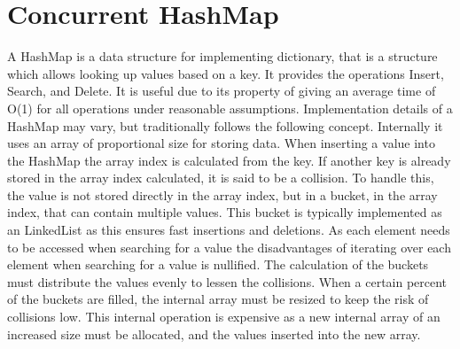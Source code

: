 \section{Concurrent HashMap}\label{app:hashmap}
A HashMap is a data structure for implementing dictionary, that is a structure which allows looking up values based on a key. It provides the operations Insert, Search, and Delete. It is useful due to its property of giving an average time of O(1) for all operations under reasonable assumptions\cite[p. 253]{cormen2009introduction}. Implementation details of a HashMap may vary, but traditionally follows the following concept\cite[p. 253]{cormen2009introduction}. Internally it uses an array of proportional size for storing data. When inserting a value into the HashMap the array index is calculated from the key. If another key is already stored in the array index calculated, it is said to be a collision. To handle this, the value is not stored directly in the array index, but in a bucket, in the array index, that can contain multiple values. This bucket is typically implemented as an LinkedList as this ensures fast insertions and deletions. As each element needs to be accessed when searching for a value the disadvantages of iterating over each element when searching for a value is nullified. The calculation of the buckets must distribute the values evenly to lessen the collisions. When a certain percent of the buckets are filled, the internal array must be resized to keep the risk of collisions low. This internal operation is expensive as a new internal array of an increased size must be allocated, and the values inserted into the new array.

